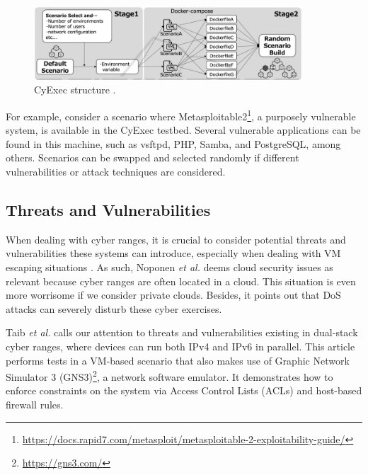 \begin{figure}[H]
    \includegraphics[width=10cm]{figures/cyexec_structure.png}
    \caption{CyExec structure \cite{cyexec_ref}.}
    \label{fig:cyexec_structure}
\end{figure}

For example, consider a scenario where Metasploitable2\footnote{\url{https://docs.rapid7.com/metasploit/metasploitable-2-exploitability-guide/}}, a purposely vulnerable system, is available in the CyExec testbed. Several vulnerable applications can be found in this machine, such as vsftpd, PHP, Samba, and PostgreSQL, among others. Scenarios can be swapped and selected randomly if different vulnerabilities or attack techniques are considered.


\subsection{Threats and Vulnerabilities} \label{sec:threats_vulnerabilities_cr}

When dealing with cyber ranges, it is crucial to consider potential threats and vulnerabilities these systems can introduce, especially when dealing with VM escaping situations \cite{pandora_ref}. As such, Noponen \textit{et al.} \cite{cybersecurity_threat_and_mitigations_ref} deems cloud security issues as relevant because cyber ranges are often located in a cloud. This situation is even more worrisome if we consider private clouds. Besides, it points out that DoS attacks can severely disturb these cyber exercises.


Taib \textit{et al.} \cite{threats_and_vulnerabilities_ref} calls our attention to threats and vulnerabilities existing in dual-stack cyber ranges, where devices can run both IPv4 and IPv6 in parallel. This article performs tests in a VM-based scenario that also makes use of Graphic Network Simulator 3 (GNS3)\footnote{\url{https://gns3.com/}}, a network software emulator. It demonstrates how to enforce constraints on the system via Access Control Lists (ACLs) and host-based firewall rules.


